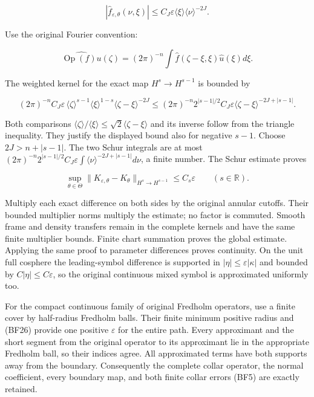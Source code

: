 \documentclass[
  11pt,
]{article}
\begin{document}
\[
 |\widehat f_{\varepsilon,\theta}(\nu,\xi)|
 \le C_J\varepsilon\langle\xi\rangle\langle\nu\rangle^{-2J}.
 \tag{BF23}
\]

Use the original Fourier convention:

\[
 \widehat{\operatorname{Op}(f)u}(\zeta)
 =(2\pi)^{-n}\int\widehat f(\zeta-\xi,\xi)\widehat u(\xi)d\xi.
 \tag{BF24}
\]

The weighted kernel for the exact map \(H^s\to H^{s-1}\) is bounded by

\[
 (2\pi)^{-n}C_J\varepsilon\,
 \langle\zeta\rangle^{s-1}\langle\xi\rangle^{1-s}
 \langle\zeta-\xi\rangle^{-2J}
 \le (2\pi)^{-n}2^{|s-1|/2}C_J\varepsilon
       \langle\zeta-\xi\rangle^{-2J+|s-1|}.
 \tag{BF25}
\]

Both comparisons
\(\langle\zeta\rangle/\langle\xi\rangle\le\sqrt2\langle\zeta-\xi\rangle\)
and its inverse follow from the triangle inequality. They justify the
displayed bound also for negative \(s-1\). Choose \(2J>n+|s-1|\). The
two Schur integrals are at most
\((2\pi)^{-n}2^{|s-1|/2}C_J\varepsilon\int\langle\nu\rangle^{-2J+|s-1|}d\nu\),
a finite number. The Schur estimate proves

\[
 \sup_{\theta\in\Theta}
 \|K_{\varepsilon,\theta}-K_\theta\|_{H^s\to H^{s-1}}
 \le C_s\varepsilon\qquad(s\in\mathbb R).
 \tag{BF26}
\]

Multiply each exact difference on both sides by the original annular
cutoffs. Their bounded multiplier norms multiply the estimate; no factor
is commuted. Smooth frame and density transfers remain in the complete
kernels and have the same finite multiplier bounds. Finite chart
summation proves the global estimate. Applying the same proof to
parameter differences proves continuity. On the unit full cosphere the
leading-symbol difference is supported in
\(|\eta|\le\varepsilon|\kappa|\) and bounded by
\(C|\eta|\le C\varepsilon\), so the original continuous mixed symbol is
approximated uniformly too.

For the compact continuous family of original Fredholm operators, use a
finite cover by half-radius Fredholm balls. Their finite minimum
positive radius and (BF26) provide one positive \(\varepsilon\) for the
entire path. Every approximant and the short segment from the original
operator to its approximant lie in the appropriate Fredholm ball, so
their indices agree. All approximated terms have both supports away from
the boundary. Consequently the complete collar operator, the normal
coefficient, every boundary map, and both finite collar errors (BF5) are
exactly retained.
\end{document}
